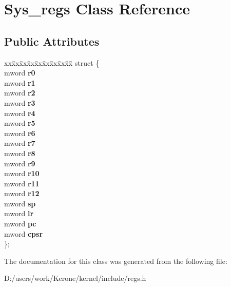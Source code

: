\section{Sys\+\_\+regs Class Reference}
\label{class_sys__regs}
\subsection*{Public Attributes}
\begin{DoxyCompactItemize}
\item 
\mbox{\label{class_sys__regs_adb71bb6fcc148792fa74c488304d8ae1}} 
\begin{tabbing}
xx\=xx\=xx\=xx\=xx\=xx\=xx\=xx\=xx\=\kill
struct \{\\
\>mword {\bfseries r0}\\
\>mword {\bfseries r1}\\
\>mword {\bfseries r2}\\
\>mword {\bfseries r3}\\
\>mword {\bfseries r4}\\
\>mword {\bfseries r5}\\
\>mword {\bfseries r6}\\
\>mword {\bfseries r7}\\
\>mword {\bfseries r8}\\
\>mword {\bfseries r9}\\
\>mword {\bfseries r10}\\
\>mword {\bfseries r11}\\
\>mword {\bfseries r12}\\
\>mword {\bfseries sp}\\
\>mword {\bfseries lr}\\
\>mword {\bfseries pc}\\
\>mword {\bfseries cpsr}\\
\}; \\

\end{tabbing}\end{DoxyCompactItemize}


The documentation for this class was generated from the following file\+:\begin{DoxyCompactItemize}
\item 
D\+:/users/work/\+Kerone/kernel/include/regs.\+h\end{DoxyCompactItemize}
